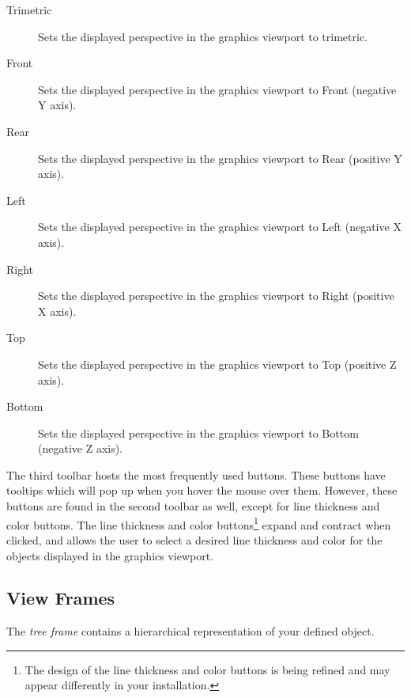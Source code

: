 \documentclass [11pt]{book}
\begin{document}
\begin{itemize}
\begin{description}
\item [Trimetric]
Sets the displayed perspective in the graphics viewport to trimetric.

\item [Front]
Sets the displayed perspective in the graphics viewport to Front (negative Y axis).

\item [Rear]
Sets the displayed perspective in the graphics viewport to Rear (positive Y axis).

\item [Left]
Sets the displayed perspective in the graphics viewport to Left (negative X axis).

\item [Right]
Sets the displayed perspective in the graphics viewport to Right (positive X axis).

\item [Top]
Sets the displayed perspective in the graphics viewport to Top (positive Z axis).

\item [Bottom]
Sets the displayed perspective in the graphics viewport to Bottom (negative Z axis).

\end{description}



\end{itemize}



The third toolbar hosts the most frequently used
buttons. These buttons have tooltips which will pop up when you hover
the mouse over them. However, these buttons are found in the second
toolbar as well, except for line thickness and color buttons. The line
thickness and color buttons\footnote{The design of the line thickness and color
buttons is being refined and may appear differently in your
installation.} expand and contract when clicked, and allows the user to
select a desired line thickness and color for the objects displayed in
the graphics viewport.



\subsection{View Frames}

\label{subsec:viewframes}



The \emph{tree frame} contains a hierarchical representation of your defined
object. 
\end{document}
